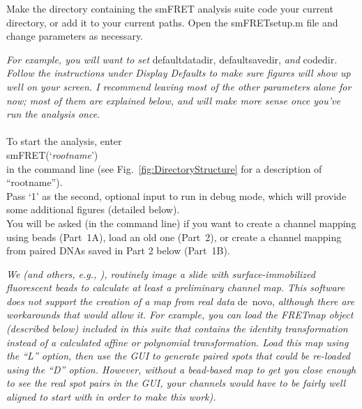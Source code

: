 \documentclass[11pt]{article}
\newcommand{\sj}[1]{\textcolor{red}{#1}}
\begin{document}
Make the directory containing the smFRET analysis suite code your current directory, or add it to your current paths. Open the smFRETsetup.m file and change parameters as necessary. 

{\it For example, you will want to set } defaultdatadir, defaultsavedir, {\it and} codedir. {\it Follow the instructions under Display Defaults to make sure figures will show up well on your screen.  I recommend leaving most of the other parameters alone for now; most of them are explained below, and will make more sense once you've run the analysis once.}\\
\\
To start the analysis, enter\\

\noindent smFRET(`{\it rootname}')\\

\noindent in the command line (see Fig.~\ref{fig:DirectoryStructure} for a description of ``rootname'').  \\


\noindent Pass `1' as the second, optional input to run in debug mode, which will provide some additional figures (detailed below).\\

\noindent You will be asked (in the command line) if you want to create a channel mapping using beads (Part~1A), load an old one (Part~2), or create a channel mapping from paired DNAs saved in Part 2 below (Part~1B). 

{\it We (and others, e.g., \cite{Deindl2012}), routinely image a slide with surface-immobilized fluorescent beads to calculate at least a preliminary channel map.  This software does not support the creation of a map from real data} de~novo, {\it although there are workarounds that would allow it.  For example, you can load the FRETmap object (described below) included in this suite that contains the identity transformation instead of a calculated affine or polynomial transformation. Load this map using the ``L'' option, then use the GUI to generate paired spots that could be re-loaded using the ``D'' option.  However, without a bead-based map to get you close enough to see the real spot pairs in the GUI, your channels would have to be fairly well aligned to start with in order to make this work).}
\end{document}
